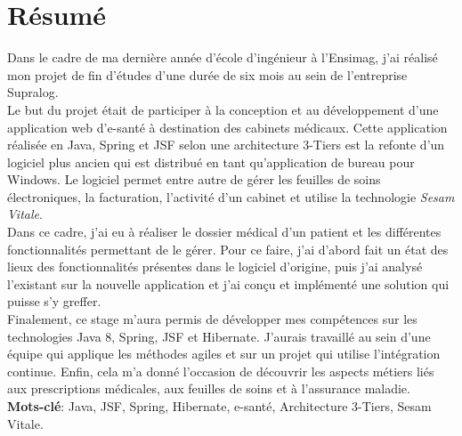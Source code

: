 \newpage
\section*{Résumé}  

Dans le cadre de ma dernière année d'école d'ingénieur à l’Ensimag, j’ai réalisé mon projet de fin d’études d’une durée de six mois au sein de l’entreprise Supralog.\\

Le but du projet était de participer à la conception et au développement d’une application web d’e-santé à destination des cabinets médicaux. Cette application réalisée en Java, Spring et JSF selon une architecture 3-Tiers est la refonte d'un logiciel plus ancien qui est distribué en tant qu'application de bureau pour Windows. Le logiciel permet entre autre de gérer les feuilles de soins électroniques, la facturation, l'activité d'un cabinet et utilise la technologie \textit{\gls{Sesam Vitale}}.\\

Dans ce cadre, j’ai eu à réaliser le dossier médical d'un patient et les différentes fonctionnalités permettant de le gérer. Pour ce faire, j'ai d'abord fait un état des lieux des fonctionnalités présentes dans le logiciel d'origine, puis j'ai analysé l'existant sur la nouvelle application et j'ai conçu et implémenté une solution qui puisse s'y greffer.\\

Finalement, ce stage m'aura permis de développer mes compétences sur les technologies Java 8, Spring, JSF et Hibernate. J'aurais  travaillé au sein d'une équipe qui applique les méthodes agiles et sur un projet qui utilise l'intégration continue. Enfin, cela m'a donné l'occasion de découvrir les aspects métiers liés aux prescriptions médicales, aux feuilles de soins et à l'assurance maladie.\\

\textbf{Mots-clé}: Java, JSF, Spring, Hibernate, e-santé, Architecture 3-Tiers, Sesam Vitale.